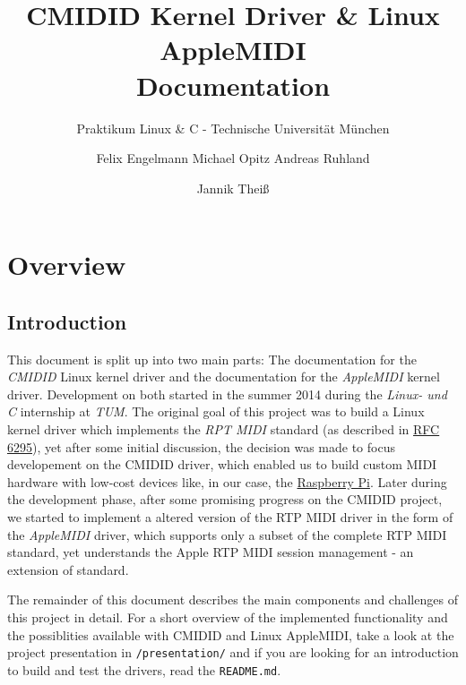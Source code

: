 \documentclass{sig-alternate}
\begin{document}
\title{CMIDID Kernel Driver \& Linux AppleMIDI\\Documentation}
\subtitle{Praktikum Linux \& C - Technische Universität München}


\author{
\alignauthor
Felix Engelmann
\alignauthor
Michael Opitz
\alignauthor
Andreas Ruhland
\and
\alignauthor
Jannik Theiß
}

\maketitle

\section{Overview}
\label{documentation:overview}

\subsection{Introduction}
\label{overview:intro}

This document is split up into two main parts: The documentation for the 
\emph{CMIDID} Linux kernel driver and the documentation for the 
\emph{AppleMIDI} kernel driver. Development on both started in the summer 
2014 during the \emph{Linux- und C} internship at \emph{TUM}. The original 
goal of this project was to build a Linux kernel driver which implements 
the \emph{RPT MIDI} standard (as described in 
\href{http://tools.ietf.org/html/rfc6295}{RFC 6295}), yet after some initial 
discussion, the decision was made to focus developement on the CMIDID driver, 
which enabled us to build custom MIDI hardware with low-cost devices like, in 
our case, the \href{www.raspberryp.org}{Raspberry Pi}. Later during the 
development phase, after some promising progress on the CMIDID project, we 
started to implement a altered version of the RTP MIDI driver in the 
form of the \emph{AppleMIDI} driver, which supports only a subset of the 
complete RTP MIDI standard, yet understands the Apple RTP MIDI session 
management - an extension of standard.

The remainder of this document describes the main components and challenges 
of this project in detail. For a short overview of the implemented 
functionality and the possiblities available with CMIDID and Linux AppleMIDI, 
take a look at the project presentation in \texttt{/presentation/} and if 
you are looking for an introduction to build and test the drivers, read the 
\texttt{README.md}.
\end{document}
